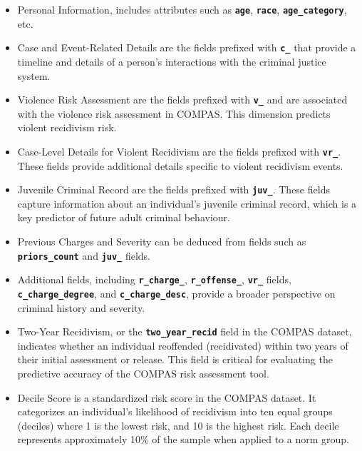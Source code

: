 \begin{itemize}
	
	\item Personal Information, includes attributes such as \textbf{\texttt{age}}, \textbf{\texttt{race}}, \textbf{\texttt{age\_category}}, etc.
	
	\item Case and Event-Related Details are the fields prefixed with \textbf{\texttt{c\_}} that provide a timeline and details of a person's interactions with the criminal justice system.
	
	\item Violence Risk Assessment are the fields prefixed with \textbf{\texttt{v\_}} and are associated with the violence risk assessment in COMPAS. This dimension predicts violent recidivism risk.
	
	\item Case-Level Details for Violent Recidivism are the fields prefixed with \textbf{\texttt{vr\_}}. These fields provide additional details specific to violent recidivism events.
	
	\item Juvenile Criminal Record are the fields prefixed with \textbf{\texttt{juv\_}}. These fields capture information about an individual's juvenile criminal record, which is a key predictor of future adult criminal behaviour.
	
	\item Previous Charges and Severity can be deduced from fields such as \textbf{\texttt{priors\_count}} and \textbf{\texttt{juv\_}} fields.
	
	\item Additional fields, including \textbf{\texttt{r\_charge\_}}, \textbf{\texttt{r\_offense\_}}, \textbf{\texttt{vr\_}} fields, \textbf{\texttt{c\_charge\_degree}}, and \textbf{\texttt{c\_charge\_desc}}, provide a broader perspective on criminal history and severity.
	
	
	\item Two-Year Recidivism, or the \textbf{\texttt{two\_year\_recid}} field in the COMPAS dataset, indicates whether an individual reoffended (recidivated) within two years of their initial assessment or release. This field is critical for evaluating the predictive accuracy of the COMPAS risk assessment tool.
	
	\item Decile Score is a standardized risk score in the COMPAS dataset. It categorizes an individual's likelihood of recidivism into ten equal groups (deciles) where 1 is the lowest risk, and 10 is the highest risk. Each decile represents approximately 10\% of the sample when applied to a norm group.
	
\end{itemize}

